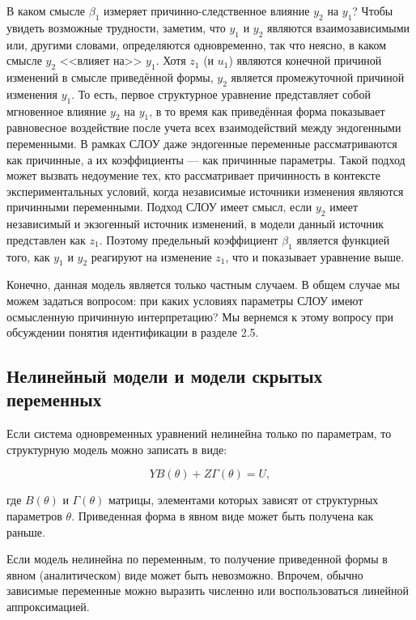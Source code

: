 В каком смысле $\beta_{1}$ измеряет причинно-следственное влияние $y_{2}$ на $y_{1}$? Чтобы увидеть возможные трудности, заметим, что $y_{1}$ и $y_{2}$ являются взаимозависимыми или, другими словами,  определяются одновременно, так что неясно, в каком смысле $y_{2}$ <<влияет на>> $y_{1}$. 
Хотя $z_{1}$ (и $u_{1}$) являются конечной причиной изменений в смысле  приведённой формы, $y_{2}$ является промежуточной причиной изменения $y_{1}$. То есть, первое структурное уравнение представляет собой мгновенное влияние  $y_{2}$ на  $y_{1}$, в то время как приведённая форма показывает равновесное воздействие после учета всех взаимодействий  между эндогенными переменными. В рамках СЛОУ даже эндогенные переменные рассматриваются как причинные, а их коэффициенты --- как причинные параметры. Такой подход может вызвать недоумение тех, кто рассматривает причинность в контексте экспериментальных условий, когда независимые источники изменения являются причинными переменными. Подход СЛОУ имеет смысл, если $y_{2}$ имеет независимый и экзогенный источник изменений, в модели данный источник представлен как $z_{1}$. Поэтому предельный коэффициент $\beta_{1}$ является функцией того, как $y_{1}$ и $y_{2}$ реагируют на изменение $z_{1}$, что и показывает уравнение выше.


Конечно, данная модель является только частным случаем. В общем случае мы можем задаться вопросом: при каких условиях параметры СЛОУ имеют осмысленную причинную интерпретацию? Мы вернемся к этому вопросу при обсуждении понятия идентификации в разделе 2.5.


\subsection{Нелинейный модели и модели скрытых переменных}


Если система одновременных уравнений нелинейна только по параметрам, то структурную модель можно записать в виде:



\begin{equation}
YB(\theta)+Z\Gamma(\theta)=U,
\end{equation}

где $B(\theta)$ и $\Gamma(\theta)$ матрицы, элементами которых зависят от структурных параметров $\theta$. Приведенная форма в явном виде может быть получена как раньше. 

Если модель нелинейна по переменным, то получение приведенной формы в явном (аналитическом) виде может быть невозможно. Впрочем, обычно зависимые переменные можно выразить численно или воспользоваться линейной аппроксимацией.


